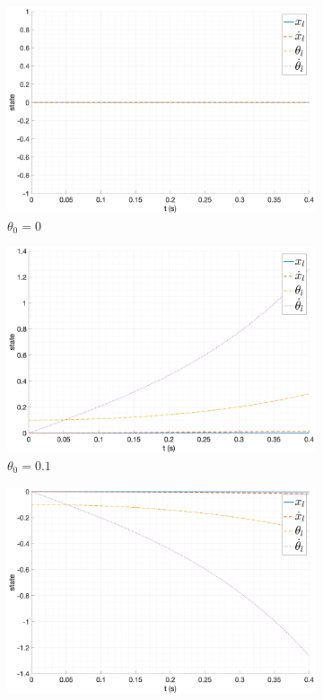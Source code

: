 \begin{figure}[ht!]
    \centering
    \begin{subfigure}[b]{0.45\textwidth}
        \includegraphics[width=\textwidth]{media/plots/free_motion/state_lin_1.png}
        \caption{$\theta_0 = 0$}
  \end{subfigure}
    \begin{subfigure}[b]{0.45\textwidth}
        \includegraphics[width=\textwidth]{media/plots/free_motion/state_lin_2.png}
        \caption{$\theta_0 = 0.1$}
    \end{subfigure}
    \begin{subfigure}[b]{0.45\textwidth}
        \includegraphics[width=\textwidth]{media/plots/free_motion/state_lin_3.png}

\end{subfigure}
\end{figure}
